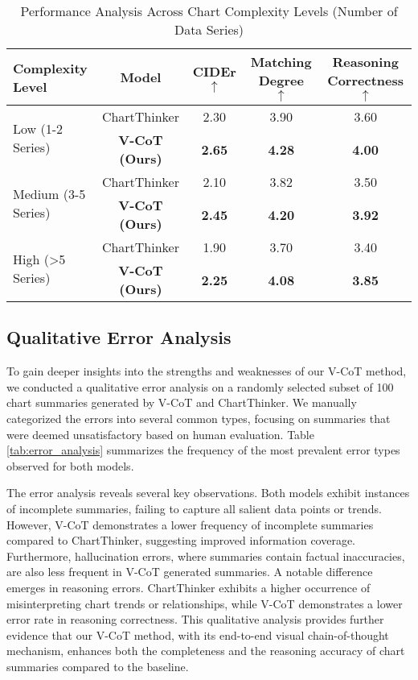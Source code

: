 \begin{table}[!t]\scriptsize
    \centering
    \caption{Performance Analysis Across Chart Complexity Levels (Number of Data Series)}
    \begin{tabular}{lcccc}
        \toprule
        Complexity Level & Model & CIDEr $\uparrow$ & Matching Degree $\uparrow$ & Reasoning Correctness $\uparrow$ \\
        \midrule
        \multirow{2}{*}{Low (1-2 Series)} & ChartThinker & 2.30 & 3.90 & 3.60 \\
                                        & \textbf{V-CoT (Ours)} & \textbf{2.65} & \textbf{4.28} & \textbf{4.00} \\
        \midrule
        \multirow{2}{*}{Medium (3-5 Series)} & ChartThinker & 2.10 & 3.82 & 3.50 \\
                                           & \textbf{V-CoT (Ours)} & \textbf{2.45} & \textbf{4.20} & \textbf{3.92} \\
        \midrule
        \multirow{2}{*}{High (>5 Series)} & ChartThinker & 1.90 & 3.70 & 3.40 \\
                                         & \textbf{V-CoT (Ours)} & \textbf{2.25} & \textbf{4.08} & \textbf{3.85} \\
        \bottomrule
    \end{tabular}
    \label{tab:chart_complexity_analysis}
\end{table}


\subsection{Qualitative Error Analysis}

To gain deeper insights into the strengths and weaknesses of our V-CoT method, we conducted a qualitative error analysis on a randomly selected subset of 100 chart summaries generated by V-CoT and ChartThinker.  We manually categorized the errors into several common types, focusing on summaries that were deemed unsatisfactory based on human evaluation. Table \ref{tab:error_analysis} summarizes the frequency of the most prevalent error types observed for both models.

The error analysis reveals several key observations.  Both models exhibit instances of incomplete summaries, failing to capture all salient data points or trends. However, V-CoT demonstrates a lower frequency of incomplete summaries compared to ChartThinker, suggesting improved information coverage.  Furthermore, hallucination errors, where summaries contain factual inaccuracies, are also less frequent in V-CoT generated summaries.  A notable difference emerges in reasoning errors. ChartThinker exhibits a higher occurrence of misinterpreting chart trends or relationships, while V-CoT demonstrates a lower error rate in reasoning correctness. This qualitative analysis provides further evidence that our V-CoT method, with its end-to-end visual chain-of-thought mechanism, enhances both the completeness and the reasoning accuracy of chart summaries compared to the baseline.

